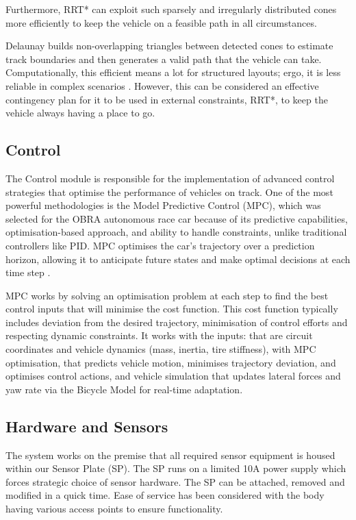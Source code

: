 \documentclass[a4paper,11pt]{report}
\begin{document}
Furthermore, RRT* can exploit such sparsely and irregularly 
distributed cones more efficiently to keep the vehicle on a feasible path in all circumstances.

Delaunay builds non-overlapping 
triangles between detected cones to estimate track boundaries and then generates a valid path that the vehicle can take. 
Computationally, this efficient means a lot for structured layouts; ergo, it is less reliable in complex scenarios \cite{reference6}. 
However, this can be considered an effective contingency plan for it to be used in external constraints, RRT*, to keep the vehicle always having a place to go.


\subsection{Control}

The Control module is responsible for the implementation of advanced control strategies that optimise the performance of vehicles on track. 
One of the most powerful methodologies is the Model Predictive Control (MPC), which was selected for the OBRA 
autonomous race car because of its predictive capabilities, optimisation-based approach, and ability to handle 
constraints, unlike traditional controllers like PID. MPC optimises the car's trajectory over a prediction horizon, 
allowing it to anticipate future states and make optimal decisions at each time step \cite{reference25}.

MPC works by solving an optimisation problem at each step to find the best control inputs that will minimise 
the cost function. This cost function typically includes deviation from the desired trajectory, minimisation 
of control efforts and respecting dynamic constraints. It works with the inputs: that are circuit coordinates and vehicle dynamics 
(mass, inertia, tire stiffness), with MPC optimisation, that predicts vehicle motion, minimises trajectory deviation, 
and optimises control actions, and vehicle simulation that updates lateral forces and yaw rate via the Bicycle Model 
for real-time adaptation.


\subsection{Hardware and Sensors}

The system works on the premise that all required sensor equipment is housed within our Sensor Plate (SP). 
The SP runs on a limited 10A power supply which forces strategic choice of sensor hardware. 
The SP can be attached, removed and modified in a quick time. Ease of service has been considered with the 
body having various access points to ensure functionality.
\end{document}
